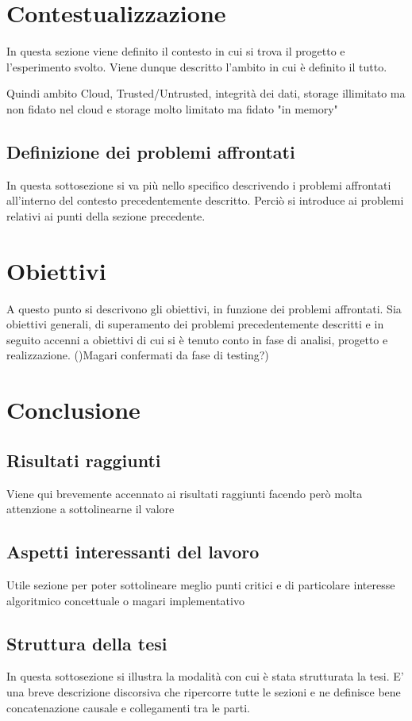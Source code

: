 \section{Contestualizzazione}
	
	In questa sezione viene definito il contesto in cui si trova il progetto e l'esperimento svolto.
	Viene dunque descritto l'ambito in cui è definito il tutto.
	
	Quindi ambito Cloud, Trusted/Untrusted, integrità dei dati, storage illimitato ma non fidato nel cloud e storage molto limitato ma fidato "in memory"
	 
	\subsection{Definizione dei problemi affrontati}
	
		In questa sottosezione si va più nello specifico descrivendo i problemi affrontati all'interno del contesto 
		precedentemente descritto.
		Perciò si introduce ai problemi relativi ai punti della sezione precedente.

\section{Obiettivi}

	A questo punto si descrivono gli obiettivi, in funzione dei problemi affrontati. Sia obiettivi generali, di superamento dei problemi 
	precedentemente descritti e in seguito accenni a obiettivi di cui si è tenuto conto in fase di analisi, progetto e realizzazione.
	()Magari confermati da fase di testing?)

\section{Conclusione}
	
	\subsection{Risultati raggiunti}
	
		Viene qui brevemente accennato ai risultati raggiunti facendo però molta attenzione a sottolinearne il valore 
		
	\subsection{Aspetti interessanti del lavoro}
	
	Utile sezione per poter sottolineare meglio punti critici e di particolare interesse algoritmico concettuale o magari implementativo
	
	\subsection{Struttura della tesi}
	
	In questa sottosezione si illustra la modalità con cui è stata strutturata la tesi. E' una breve descrizione discorsiva che ripercorre tutte le sezioni e ne
	definisce bene concatenazione causale e collegamenti tra le parti.